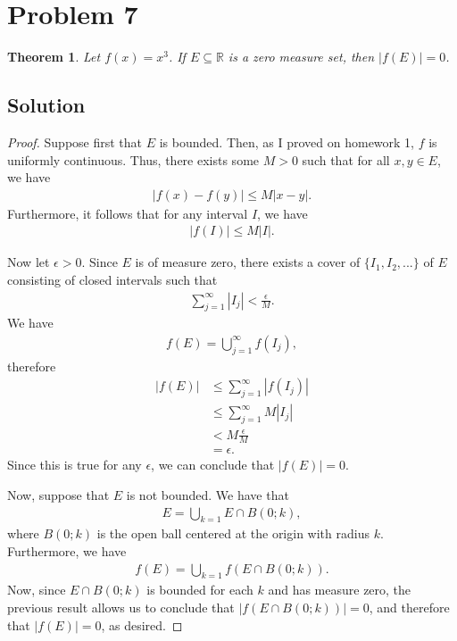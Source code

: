 \documentclass[10pt,a4paper]{article}
\theoremstyle{theorem}
\newtheorem{theorem}{Theorem}
\theoremstyle{definition}
\begin{document}
\section*{Problem 7}
\begin{theorem}
Let $f(x) = x^3$.  If $E \subseteq \mathbb{R}$ is a zero measure set, then $|f(E)| = 0$.
\end{theorem}

\subsection*{Solution}
\begin{proof}
Suppose first that $E$ is bounded. Then, as I proved on homework 1, $f$ is uniformly continuous. Thus, there exists some $M > 0$ such that for all $x,y \in E$, we have
\begin{align*}
|f(x) - f(y)| \leq M|x - y|.
\end{align*}
Furthermore, it follows that for any interval $I$, we have
\begin{align*}
|f(I)| \leq M|I|.
\end{align*}

Now let $\epsilon > 0$. Since $E$ is of measure zero, there exists a cover of $\{I_1, I_2,...\}$ of $E$ consisting of closed intervals such that 
\begin{align*}
\sum_{j=1}^\infty |I_j| < \frac{\epsilon}{M}.
\end{align*} 
We have
\begin{align*}
f(E) = \bigcup_{j=1}^\infty f(I_j),
\end{align*}
therefore
\begin{align*}
|f(E)| &\leq \sum_{j=1}^\infty |f(I_j)| \\
&\leq \sum_{j=1}^\infty M|I_j| \\
&< M \frac{\epsilon}{M}\\
&= \epsilon.
\end{align*}
Since this is true for any $\epsilon$, we can conclude that $|f(E)| = 0$. 

Now, suppose that $E$ is not bounded. We have that
\begin{align*}
E = \bigcup_{k = 1} E \cap B(0; k),
\end{align*}
where $B(0; k)$ is the open ball centered at the origin with radius $k$.  Furthermore, we have
\begin{align*}
f(E) = \bigcup_{k = 1} f(E \cap B(0; k)).
\end{align*}
Now, since $E \cap B(0; k)$ is bounded for each $k$ and has measure zero, the previous result allows us to conclude that $|f(E \cap B(0; k))| = 0$, and therefore that $|f(E)| = 0$, as desired.
\end{proof}
\end{document}
